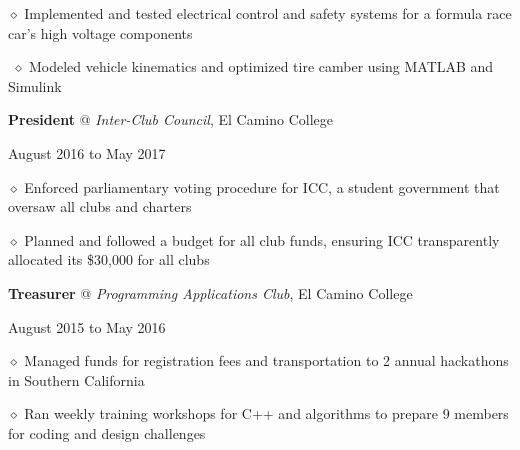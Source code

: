 \documentclass [11pt]{article}
\begin{document}
\begin{flushleft}
‭‭\quad\quad\quad$\diamond$ Implemented and tested electrical control and safety systems for a formula race car’s high voltage components

‭‭%
\quad\quad\quad$\diamond$ Modeled vehicle kinematics and optimized tire camber using MATLAB and Simulink

\linebreak
\textbf{President} @ \emph{Inter-Club Council}, El Camino College \begin{minipage}{0.565 \linewidth}\begin{flushright}August 2016 to May 2017\end{flushright}\end{minipage}

‭‭\quad\quad\quad$\diamond$ Enforced parliamentary voting procedure for ICC, a student government that oversaw all clubs and charters

‭‭\quad\quad\quad$\diamond$ Planned and followed a budget for all club funds, ensuring ICC transparently allocated its \$30,000 for all clubs

\linebreak
\textbf{Treasurer} @ \emph{Programming Applications Club}, El Camino College \begin{minipage}{0.450 \linewidth}\begin{flushright}August 2015 to May 2016\end{flushright}\end{minipage}

‭‭\quad\quad\quad$\diamond$ Managed funds for registration fees and transportation to 2 annual hackathons in Southern California

‭‭\quad\quad\quad$\diamond$ Ran weekly training workshops for C++ and algorithms to prepare 9 members for coding and design challenges




\end{flushleft}
\end{document}
